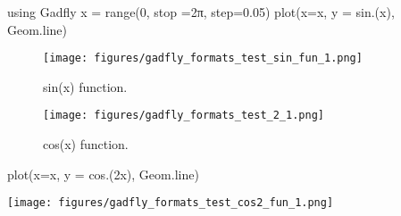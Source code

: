 \begin{juliacode}
using Gadfly
x = range(0, stop =2π, step=0.05)
plot(x=x, y = sin.(x), Geom.line)
\end{juliacode}
\begin{figure}[ht]
\center
\texttt{[image: figures/gadfly\_formats\_test\_sin\_fun\_1.png]}
\caption{sin(x) function.}
\label{fig:sin_fun}
\end{figure}

\begin{figure}[htpb]
\center
\texttt{[image: figures/gadfly\_formats\_test\_2\_1.png]}
\caption{cos(x) function.}
\end{figure}

\begin{juliacode}
plot(x=x, y = cos.(2x), Geom.line)
\end{juliacode}
\texttt{[image: figures/gadfly\_formats\_test\_cos2\_fun\_1.png]}
